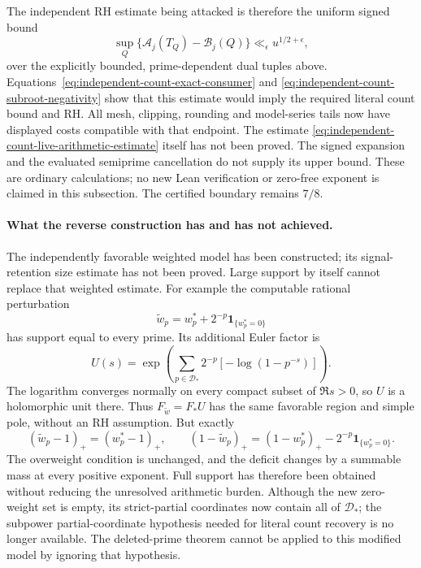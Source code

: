 \documentclass[11pt]{article}
\theoremstyle{definition}
\begin{document}
The independent RH estimate being attacked is therefore the
uniform signed bound
\begin{equation}
 \sup_{Q}\{\mathcal A_j(T_Q)-\mathcal B_j(Q)\}
                         \ll_\epsilon u^{1/2+\epsilon},
 \label{eq:independent-count-live-arithmetic-estimate}
\end{equation}
over the explicitly bounded, prime-dependent dual tuples above.
Equations~\eqref{eq:independent-count-exact-consumer} and
\eqref{eq:independent-count-subroot-negativity} show that this
estimate would imply the required literal count bound and RH.
All mesh, clipping, rounding and model-series tails now have
displayed costs compatible with that endpoint.
The estimate \eqref{eq:independent-count-live-arithmetic-estimate}
itself has not been proved. The signed expansion and the
evaluated semiprime cancellation do not supply its upper bound.
These are ordinary calculations; no new Lean verification or
zero-free exponent is claimed in this subsection.
The certified boundary remains $7/8$.

\paragraph{What the reverse construction has and has not achieved.}
The independently favorable weighted model has been constructed;
its signal-retention size estimate has not been proved.
Large support by itself cannot replace that weighted estimate.
For example the computable rational perturbation
\[
 \widetilde w_p=w_p^*+2^{-p}\boldsymbol1_{\{w_p^*=0\}}
\]
has support equal to every prime. Its additional Euler factor is
\[
 U(s)=\exp\left(\sum_{p\in\mathcal D_*}
                    2^{-p}[-\log(1-p^{-s})]\right).
\]
The logarithm converges normally on every compact subset of
$\Re s>0$, so $U$ is a holomorphic unit there.
Thus $F_{\widetilde w}=F_*U$ has the same favorable region and
simple pole, without an RH assumption. But exactly
\[
 (\widetilde w_p-1)_+=(w_p^*-1)_+,\qquad
 (1-\widetilde w_p)_+=(1-w_p^*)_+
                       -2^{-p}\boldsymbol1_{\{w_p^*=0\}} .
\]
The overweight condition is unchanged, and the deficit changes
by a summable mass at every positive exponent.
Full support has therefore been obtained without reducing the
unresolved arithmetic burden.
Although the new zero-weight set is empty, its strict-partial
coordinates now contain all of $\mathcal D_*$; the subpower
partial-coordinate hypothesis needed for literal count recovery
is no longer available. The deleted-prime theorem cannot be
applied to this modified model by ignoring that hypothesis.
\end{document}
